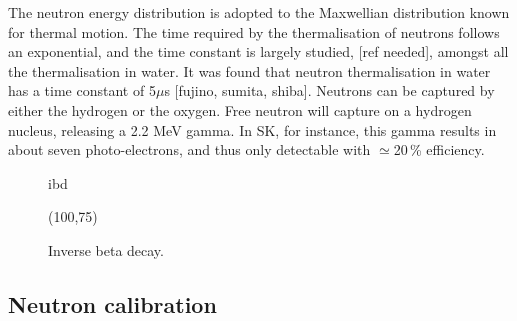 The neutron energy distribution is adopted to the Maxwellian distribution known for thermal motion.
The time required by the thermalisation of neutrons follows an exponential, and the time constant is largely %
studied, [ref needed], amongst all the thermalisation in water.
It was found that neutron thermalisation in water has a time constant of 5$\mu$s [fujino, sumita, shiba].
Neutrons can be captured by either the hydrogen or the oxygen.
Free neutron will capture on a hydrogen nucleus, releasing a 2.2 MeV gamma.
In SK, for instance, this gamma results in about seven photo-electrons, and thus only detectable with $\simeq$20\,\% %
efficiency.
\begin{figure}
	\centering
	\begin{fmffile}{ibd}
		\begin{fmfgraph*}(100,75)
			\fmffreeze
			\begin{fmfgroup}
			\end{fmfgroup}
		\end{fmfgraph*}
	\end{fmffile}
	\smallskip
	\caption{Inverse beta decay.}
\end{figure}

\subsection{Neutron calibration}


